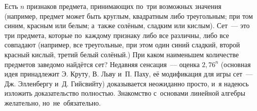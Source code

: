 


Есть $n$ признаков предмета, принимающих по три возможных значения
(например, предмет может быть круглым, квадратным либо треугольным; при том
синим, красным или белым; а также солёным, сладким или кислым).
Сет~--- это три предмета, которые по каждому признаку либо все различны, либо все
совпадают (например, все треугольные, при этом один синий сладкий, второй
красный кислый, третий белый солёный.)
При каком наименьшем количестве предметов заведомо найдётся сет?
Недавняя сенсация~--- оценка $2{,}76^{n}$
(основная идея принадлежит Э. Круту, В. Льву и П. Паху, её модификация для игры
сет~--- Дж. Элленбергу и Д. Гийсвийту)
доказывается неожиданно просто, и я надеюсь изложить доказательство полностью.
Знакомство с основами линейной алгебры желательно, но не обязательно.

